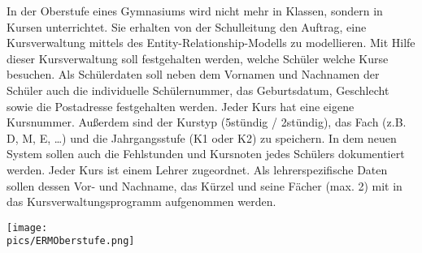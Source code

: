 \begin{Answer}[ref=ERMErstellen3]

	In der Oberstufe eines Gymnasiums wird nicht mehr in Klassen, sondern in Kursen unterrichtet. Sie erhalten von der Schulleitung den Auftrag, eine Kursverwaltung mittels des Entity-Relationship-Modells zu modellieren. Mit Hilfe dieser Kursverwaltung soll festgehalten werden, welche Schüler welche Kurse besuchen. Als Schülerdaten soll neben dem Vornamen und Nachnamen der Schüler auch die individuelle Schülernummer, das Geburtsdatum, Geschlecht sowie die Postadresse festgehalten werden. Jeder Kurs hat eine eigene Kursnummer. Außerdem sind der Kurstyp (5stündig / 2stündig), das Fach (z.B. D, M, E, …) und die Jahrgangsstufe (K1 oder K2) zu speichern. In dem neuen System sollen auch die Fehlstunden und Kursnoten jedes Schülers dokumentiert werden. Jeder Kurs ist einem Lehrer zugeordnet. Als lehrerspezifische Daten sollen dessen Vor- und Nachname, das Kürzel und seine Fächer (max. 2) mit in das Kursverwaltungsprogramm aufgenommen werden.

	\begin{minipage}{\textwidth}
		\centering\texttt{[image: \\pics/ERMOberstufe.png]}
	\end{minipage}
\end{Answer}
